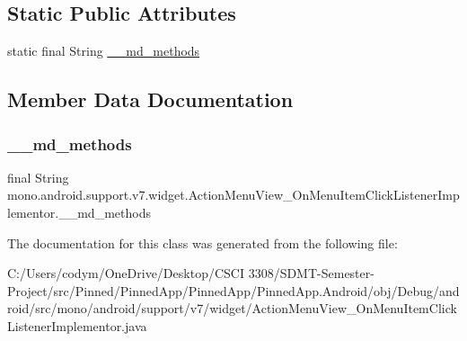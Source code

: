 \subsection*{Static Public Attributes}
\begin{DoxyCompactItemize}
\item 
static final String \hyperlink{classmono_1_1android_1_1support_1_1v7_1_1widget_1_1_action_menu_view___on_menu_item_click_listener_implementor_aa8cb9f08db4743ab028af01b66a66cf1}{\+\_\+\+\_\+md\+\_\+methods}
\end{DoxyCompactItemize}


\subsection{Member Data Documentation}
\mbox{\label{classmono_1_1android_1_1support_1_1v7_1_1widget_1_1_action_menu_view___on_menu_item_click_listener_implementor_aa8cb9f08db4743ab028af01b66a66cf1}} 
\subsubsection{\texorpdfstring{\+\_\+\+\_\+md\+\_\+methods}{\_\_md\_methods}}
{\footnotesize\ttfamily final String mono.\+android.\+support.\+v7.\+widget.\+Action\+Menu\+View\+\_\+\+On\+Menu\+Item\+Click\+Listener\+Implementor.\+\_\+\+\_\+md\+\_\+methods\hspace{0.3cm}{\ttfamily [static]}}



The documentation for this class was generated from the following file\+:\begin{DoxyCompactItemize}
\item 
C\+:/\+Users/codym/\+One\+Drive/\+Desktop/\+C\+S\+C\+I 3308/\+S\+D\+M\+T-\/\+Semester-\/\+Project/src/\+Pinned/\+Pinned\+App/\+Pinned\+App/\+Pinned\+App.\+Android/obj/\+Debug/android/src/mono/android/support/v7/widget/Action\+Menu\+View\+\_\+\+On\+Menu\+Item\+Click\+Listener\+Implementor.\+java\end{DoxyCompactItemize}
